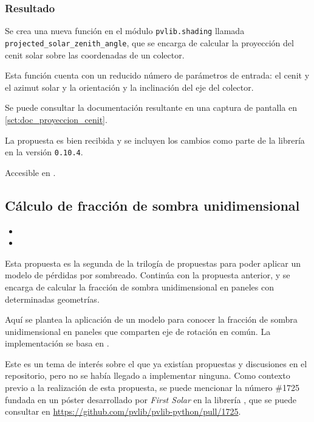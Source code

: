\subsubsection{Resultado}

Se crea una nueva función en el módulo \texttt{pvlib.shading} llamada \texttt{projected\_solar\_zenith\_angle}, que se encarga de calcular la proyección del cenit solar sobre las coordenadas de un colector.

Esta función cuenta con un reducido número de parámetros de entrada: el cenit y el azimut solar y la orientación y la inclinación del eje del colector.

Se puede consultar la documentación resultante en una captura de pantalla en \ref{sct:doc_proyeccion_cenit}.

La propuesta es bien recibida y se incluyen los cambios como parte de la librería en la versión \texttt{0.10.4}.

Accesible en .

\subsection{Cálculo de fracción de sombra unidimensional} \label{sct:desarrollo:contribuciones_cientificas:fraccion_sombra}

\begin{itemize}
    \item {}
    \item {}
\end{itemize}

Esta propuesta es la segunda de la trilogía de propuestas para poder aplicar un modelo de pérdidas por sombreado. Continúa con la propuesta anterior, y se encarga de calcular la fracción de sombra unidimensional en paneles con determinadas geometrías.

Aquí se plantea la aplicación de un modelo para conocer la fracción de sombra unidimensional en paneles que comparten eje de rotación en común. La implementación se basa en \cite{Anderson_Jensen_2024}.

Este es un tema de interés sobre el que ya existían propuestas y discusiones en el repositorio, pero no se había llegado a implementar ninguna. Como contexto previo a la realización de esta propuesta, se puede mencionar la número \#1725 fundada en un póster desarrollado por \textit{First Solar} en la librería \pvlibpy, que se puede consultar en \url{https://github.com/pvlib/pvlib-python/pull/1725}.

